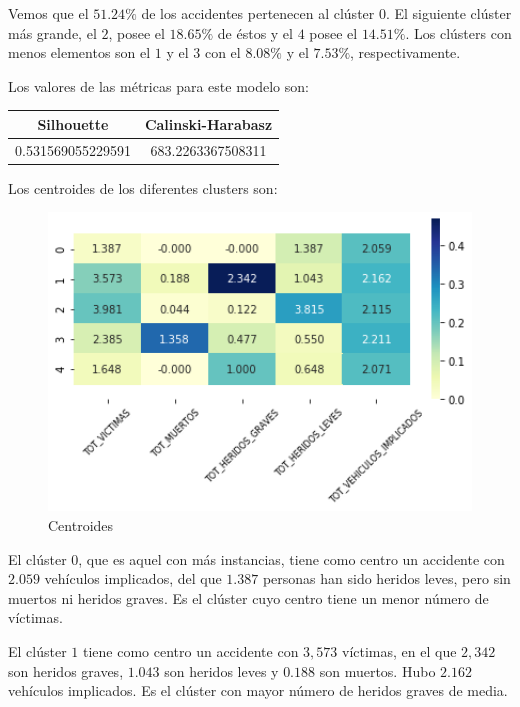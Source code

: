 \documentclass[a4]{article}
\begin{document}
Vemos que el $51.24\%$ de los accidentes pertenecen al clúster $0$. El siguiente clúster más grande, el $2$, posee el $18.65\%$ de éstos y el $4$ posee el $14.51\%$. Los clústers con menos elementos son el $1$ y el $3$ con el $8.08\%$ y el $7.53\%$, respectivamente.

Los valores de las métricas para este modelo son:

\begin{center}
\begin{tabular}{|c|c|}
\hline
\multicolumn{1}{|c|}{\textbf{Silhouette}} & \textbf{Calinski-Harabasz}\\ \hline
 0.531569055229591   & 683.2263367508311  \\ \hline
\end{tabular}
\end{center}

Los centroides de los diferentes clusters son:

\begin{figure}[H]
  \centering
  \caption{Centroides}
  \includegraphics[width=130mm]{imagenes/c1_kmeans_centroides}
\end{figure}

El clúster $0$, que es aquel con más instancias, tiene como centro un accidente con $2.059$ vehículos implicados, del que $1.387$ personas han sido heridos leves, pero sin muertos ni heridos graves. Es el clúster cuyo centro tiene un menor número de víctimas.

El clúster $1$ tiene como centro un accidente con $3,573$ víctimas, en el que $2,342$ son heridos graves, $1.043$ son heridos leves y $0.188$ son muertos. Hubo $2.162$ vehículos implicados. Es el clúster con mayor número de heridos graves de media.
\end{document}
